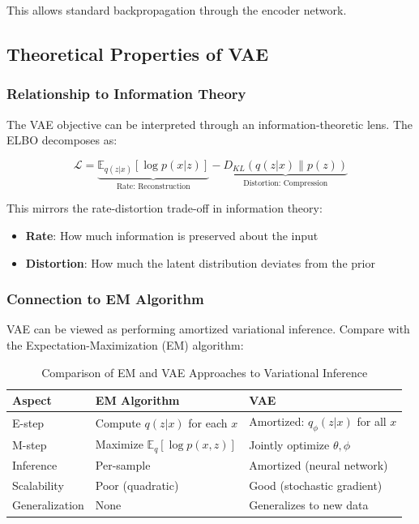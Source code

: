 \documentclass[conference]{IEEEtran}
\begin{document}
This allows standard backpropagation through the encoder network.

\subsection{Theoretical Properties of VAE}

\subsubsection{Relationship to Information Theory}

The VAE objective can be interpreted through an information-theoretic lens. The ELBO decomposes as:

\begin{equation}
\mathcal{L} = \underbrace{\mathbb{E}_{q(z|x)}[\log p(x|z)]}_{\text{Rate: Reconstruction}} - \underbrace{D_{KL}(q(z|x) \| p(z))}_{\text{Distortion: Compression}}
\end{equation}

This mirrors the rate-distortion trade-off in information theory:
\begin{itemize}
    \item \textbf{Rate}: How much information is preserved about the input
    \item \textbf{Distortion}: How much the latent distribution deviates from the prior
\end{itemize}

\subsubsection{Connection to EM Algorithm}

VAE can be viewed as performing amortized variational inference. Compare with the Expectation-Maximization (EM) algorithm:

\begin{table}[!t]
\renewcommand{\arraystretch}{1.3}
\caption{Comparison of EM and VAE Approaches to Variational Inference}
\label{tab:em_vae}
\centering
\begin{tabular}{lll}
\hline
\textbf{Aspect} & \textbf{EM Algorithm} & \textbf{VAE} \\ \hline
E-step & Compute $q(z|x)$ for each $x$ & Amortized: $q_\phi(z|x)$ for all $x$ \\
M-step & Maximize $\mathbb{E}_q[\log p(x,z)]$ & Jointly optimize $\theta, \phi$ \\
Inference & Per-sample & Amortized (neural network) \\
Scalability & Poor (quadratic) & Good (stochastic gradient) \\
Generalization & None & Generalizes to new data \\ \hline
\end{tabular}
\end{table}
\end{document}
